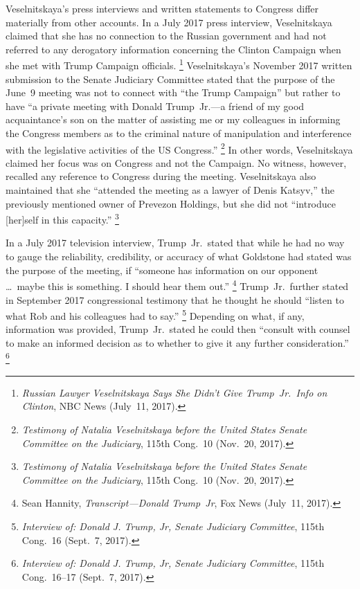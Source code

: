 Veselnitskaya's press interviews and written statements to Congress differ materially from other accounts.
In a July 2017 press interview, Veselnitskaya claimed that she has no connection to the Russian government and had not referred to any derogatory information concerning the Clinton Campaign when she met with Trump Campaign officials.%
\footnote{\textit{Russian Lawyer Veselnitskaya Says She Didn't Give Trump~Jr.\ Info on Clinton}, NBC News (July~11, 2017).}
Veselnitskaya's November 2017 written submission to the Senate Judiciary Committee stated that the purpose of the June~9 meeting was not to connect with ``the Trump Campaign'' but rather to have ``a private meeting with Donald Trump~Jr.---a friend of my good acquaintance's son on the matter of assisting me or my colleagues in informing the Congress members as to the criminal nature of manipulation and interference with the legislative activities of the US Congress.''%
\footnote{\textit{Testimony of Natalia Veselnitskaya before the United States Senate Committee on the Judiciary}, 115th Cong.~10 (Nov.~20, 2017).}
In other words, Veselnitskaya claimed her focus was on Congress and not the Campaign.
No witness, however, recalled any reference to Congress during the meeting.
Veselnitskaya also maintained that she ``attended the meeting as a lawyer of Denis Katsyv,'' the previously mentioned owner of Prevezon Holdings, but she did not ``introduce [her]self in this capacity.''%
\footnote{\textit{Testimony of Natalia Veselnitskaya before the United States Senate Committee on the Judiciary}, 115th Cong.~10 (Nov.~20, 2017).}

In a July 2017 television interview, Trump~Jr.\ stated that while he had no way to gauge the reliability, credibility, or accuracy of what Goldstone had stated was the purpose of the meeting, if ``someone has information on our opponent \dots\ maybe this is something.
I should hear them out.''%
\footnote{Sean Hannity, \textit{Transcript---Donald Trump~Jr}, Fox News (July~11, 2017).}
Trump~Jr.\ further stated in September 2017 congressional testimony that he thought he should ``listen to what Rob and his colleagues had to say.''%
\footnote{\textit{Interview of: Donald J. Trump, Jr, Senate Judiciary Committee}, 115th Cong.~16 (Sept.~7, 2017).}
Depending on what, if any, information was provided, Trump~Jr.\ stated he could then ``consult with counsel to make an informed decision as to whether to give it any further consideration.''%
\footnote{\textit{Interview of: Donald J. Trump, Jr, Senate Judiciary Committee}, 115th Cong.~16--17 (Sept.~7, 2017).}

